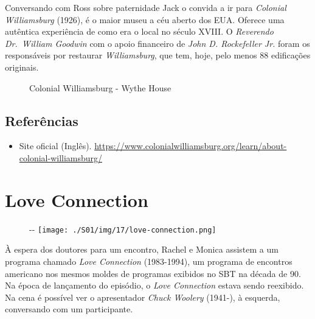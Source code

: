 Conversando com Ross sobre paternidade Jack o convida a ir para
\emph{Colonial Williamsburg} (1926), é o maior museu a céu aberto dos
EUA. Oferece uma autêntica experiência de como era o local no século
XVIII. O \emph{Reverendo Dr.~William Goodwin} com o apoio financeiro de
\emph{John D. Rockefeller Jr.} foram os responsáveis por restaurar
\emph{Williamsburg}, que tem, hoje, pelo menos 88 edificações originais.

\begin{figure}
  \centering
    \caption{Colonial Williamsburg - Wythe House\label{fig:colonial-williamsburg-wythe-house}}
\end{figure}

\hypertarget{referuxeancias-1}{%
\subsection{Referências}\label{referuxeancias-1}}

\begin{itemize}
\tightlist
\item
  \sloppy Site oficial (Inglês). \url{https://www.colonialwilliamsburg.org/learn/about-colonial-williamsburg/}
\end{itemize}

\hypertarget{love-connection}{%
\section{Love Connection}\label{love-connection}}

\begin{figure}[!ht]
  \begin{adjustwidth}{-\oddsidemargin-1in}{-\rightmargin}
    \centering
    \texttt{[image: ./S01/img/17/love-connection.png]}
  \end{adjustwidth}
\end{figure}

À espera dos doutores para um encontro, Rachel e Monica assistem a um
programa chamado \emph{Love Connection} (1983-1994), um programa de
encontros americano nos mesmos moldes de programas exibidos no SBT na
década de 90. Na época de lançamento do episódio, o \emph{Love
Connection} estava sendo reexibido. Na cena é possível ver o
apresentador \emph{Chuck Woolery} (1941-), à esquerda, conversando com
um participante.

